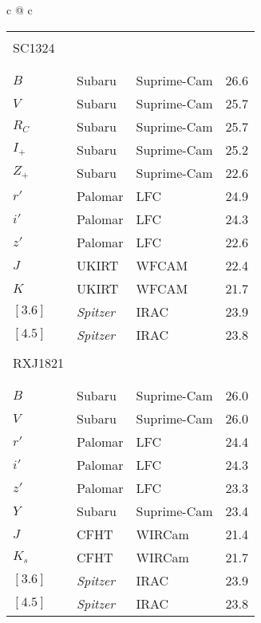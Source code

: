 \documentclass[a4paper,fleqn,usenatbib]{mnras}
\begin{document}
\begin{table*}
\begin{center}
\begin{tabular}{c @{\hskip 15mm} c}
\begin{tabular}{llll}
		\hline \\[-3mm]
		SC1324 \\[-1mm]
		\hline \\[-5mm]  
		\hline \\[-2mm]

		$B$    &   Subaru   &   Suprime-Cam   &   26.6   \\
		$V$    &   Subaru   &   Suprime-Cam   &   25.7   \\
		$R_C$  &   Subaru   &   Suprime-Cam   &   25.7   \\
		$I_+$  &   Subaru   &   Suprime-Cam   &   25.2   \\
		$Z_+$  &   Subaru   &   Suprime-Cam   &   22.6   \\
		$r'$   &   Palomar   &   LFC   &   24.9   \\
		$i'$   &   Palomar   &   LFC   &   24.3   \\
		$z'$   &   Palomar   &   LFC   &   22.6   \\
		$J$   &   UKIRT   &   WFCAM   &   22.4   \\
		$K$   &   UKIRT   &   WFCAM   &   21.7   \\
		$[3.6]$  &   {\it Spitzer}  &   IRAC   &   23.9   \\
		$[4.5]$  &   {\it Spitzer}  &   IRAC   &   23.8   \\[1mm]


		\hline \\[-3mm]
		RXJ1821 \\[-1mm]
		\hline \\[-5mm]  
		\hline \\[-2mm]

		$B$    &   Subaru   &   Suprime-Cam   &   26.0   \\
		$V$    &   Subaru   &   Suprime-Cam   &   26.0   \\
		$r'$   &   Palomar   &   LFC   &   24.4   \\
		$i'$   &   Palomar   &   LFC   &   24.3   \\
		$z'$   &   Palomar   &   LFC   &   23.3   \\
		$Y$    &   Subaru   &   Suprime-Cam   &   23.4   \\
		$J$     &   CFHT   &   WIRCam   &   21.4   \\
		$K_s$   &   CFHT   &   WIRCam   &   21.7   \\
		$[3.6]$  &   {\it Spitzer}  &   IRAC   &   23.9   \\
		$[4.5]$  &   {\it Spitzer}  &   IRAC   &   23.8   \\[1mm]



\end{tabular}
\end{tabular}
\end{center}
\end{table*}
\end{document}
